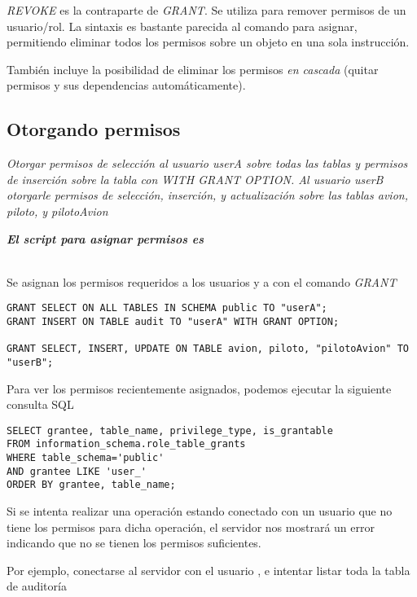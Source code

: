 \emph{REVOKE} es la contraparte de \emph{GRANT}. Se utiliza para remover permisos de un usuario/rol. La sintaxis es bastante parecida al comando para asignar, permitiendo eliminar todos los permisos sobre un objeto en una sola instrucción.

También incluye la posibilidad de eliminar los permisos \emph{en cascada} (quitar permisos y sus dependencias automáticamente).

\subsection{Otorgando permisos}
\emph{Otorgar permisos de selección al usuario userA sobre todas las tablas y permisos de inserción sobre la tabla  con WITH GRANT OPTION. Al usuario userB otorgarle permisos de selección, inserción, y actualización sobre las tablas \emph{avion, piloto, y pilotoAvion}} 

\emph{\textbf{El script para asignar permisos es }} 

~\\

Se asignan los permisos requeridos a los usuarios  y a  con el comando \emph{GRANT} 

\vspace*{5mm}
\lstset{style=sql}
\begin{lstlisting}
GRANT SELECT ON ALL TABLES IN SCHEMA public TO "userA";
GRANT INSERT ON TABLE audit TO "userA" WITH GRANT OPTION;

GRANT SELECT, INSERT, UPDATE ON TABLE avion, piloto, "pilotoAvion" TO "userB";
\end{lstlisting}

Para ver los permisos recientemente asignados, podemos ejecutar la siguiente consulta SQL

\vspace*{5mm}
\lstset{style=sql}
\begin{lstlisting}
SELECT grantee, table_name, privilege_type, is_grantable 
FROM information_schema.role_table_grants 
WHERE table_schema='public'
AND grantee LIKE 'user_' 
ORDER BY grantee, table_name;
\end{lstlisting}

Si se intenta realizar una operación estando conectado con un usuario que no tiene los permisos para dicha operación, el servidor nos mostrará un error indicando que no se tienen los permisos suficientes.

Por ejemplo, conectarse al servidor con el usuario , e intentar listar toda la tabla de auditoría

